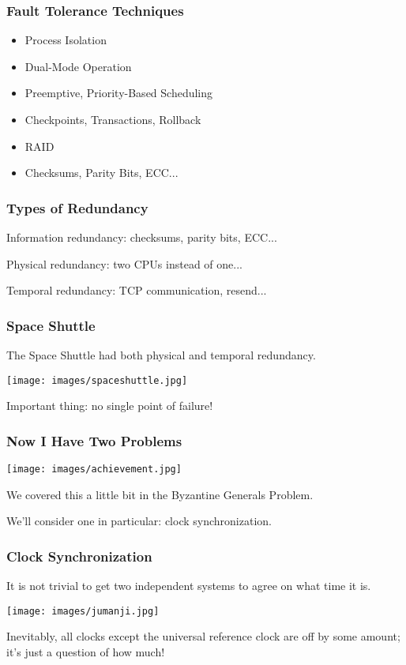 \begin{frame}
\frametitle{Fault Tolerance Techniques}

\begin{itemize}
	\item Process Isolation
	\item Dual-Mode Operation
	\item Preemptive, Priority-Based Scheduling
	\item Checkpoints, Transactions, Rollback
	\item RAID
	\item Checksums, Parity Bits, ECC...
\end{itemize}

\end{frame}

\begin{frame}
\frametitle{Types of Redundancy}

\alert{Information redundancy}: checksums, parity bits, ECC...

\alert{Physical redundancy}: two CPUs instead of one...

\alert{Temporal redundancy}: TCP communication, resend...

\end{frame}

\begin{frame}
\frametitle{Space Shuttle}

The Space Shuttle had both physical and temporal redundancy.

\begin{center}
	\texttt{[image: images/spaceshuttle.jpg]}
\end{center}

Important thing: no single point of failure!

\end{frame}

\begin{frame}
\frametitle{Now I Have Two Problems}


\begin{center}
	\texttt{[image: images/achievement.jpg]}
\end{center}

We covered this a little bit in the Byzantine Generals Problem.

We'll consider one in particular: clock synchronization.

\end{frame}

\begin{frame}
\frametitle{Clock Synchronization}

It is not trivial to get two independent systems to agree on what time it is.

\begin{center}
	\texttt{[image: images/jumanji.jpg]}
\end{center}

Inevitably, all clocks except the universal reference clock are off by some amount; it's just a question of how much! 

\end{frame}

